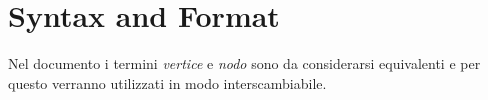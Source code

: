 
\section{Syntax and Format}

Nel documento i termini \emph{vertice} e \emph{nodo} sono da
considerarsi equivalenti e per questo verranno utilizzati in modo
interscambiabile.
